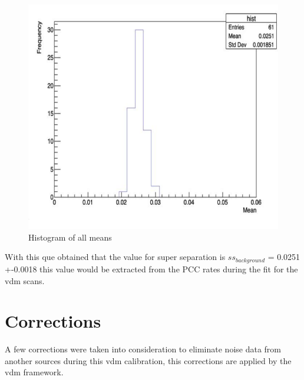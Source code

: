 \begin{figure}[H]
    \centering
    \includegraphics[width=1\textwidth]{ssthist.png}
    \caption{Histogram of all means}
    \label{fig:Histogram}
\end{figure}

With this que obtained that the value for super separation is $ss_{background}$ = 0.0251 +-0.0018 this value would be extracted from the PCC rates during the fit for the vdm scans. 

\section{Corrections}

A few corrections were taken into consideration to eliminate noise data from another sources during this vdm calibration, this corrections are applied by the vdm framework. 

